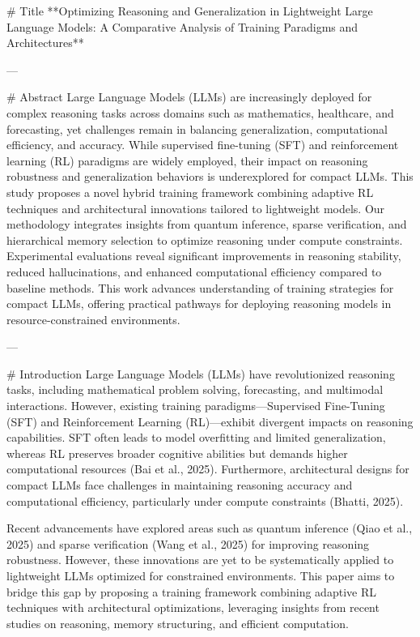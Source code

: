 # Title  
**Optimizing Reasoning and Generalization in Lightweight Large Language Models: A Comparative Analysis of Training Paradigms and Architectures**

---

# Abstract  
Large Language Models (LLMs) are increasingly deployed for complex reasoning tasks across domains such as mathematics, healthcare, and forecasting, yet challenges remain in balancing generalization, computational efficiency, and accuracy. While supervised fine-tuning (SFT) and reinforcement learning (RL) paradigms are widely employed, their impact on reasoning robustness and generalization behaviors is underexplored for compact LLMs. This study proposes a novel hybrid training framework combining adaptive RL techniques and architectural innovations tailored to lightweight models. Our methodology integrates insights from quantum inference, sparse verification, and hierarchical memory selection to optimize reasoning under compute constraints. Experimental evaluations reveal significant improvements in reasoning stability, reduced hallucinations, and enhanced computational efficiency compared to baseline methods. This work advances understanding of training strategies for compact LLMs, offering practical pathways for deploying reasoning models in resource-constrained environments.

---

# Introduction  
Large Language Models (LLMs) have revolutionized reasoning tasks, including mathematical problem solving, forecasting, and multimodal interactions. However, existing training paradigms—Supervised Fine-Tuning (SFT) and Reinforcement Learning (RL)—exhibit divergent impacts on reasoning capabilities. SFT often leads to model overfitting and limited generalization, whereas RL preserves broader cognitive abilities but demands higher computational resources (Bai et al., 2025). Furthermore, architectural designs for compact LLMs face challenges in maintaining reasoning accuracy and computational efficiency, particularly under compute constraints (Bhatti, 2025). 

Recent advancements have explored areas such as quantum inference (Qiao et al., 2025) and sparse verification (Wang et al., 2025) for improving reasoning robustness. However, these innovations are yet to be systematically applied to lightweight LLMs optimized for constrained environments. This paper aims to bridge this gap by proposing a training framework combining adaptive RL techniques with architectural optimizations, leveraging insights from recent studies on reasoning, memory structuring, and efficient computation.

